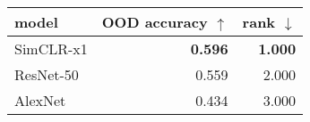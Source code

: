 \begin{tabular}{lrr}
\toprule
     model & OOD accuracy $\uparrow$ & rank $\downarrow$ \\
\midrule
 SimCLR-x1 &          \textbf{0.596} &    \textbf{1.000} \\
 ResNet-50 &                   0.559 &             2.000 \\
   AlexNet &                   0.434 &             3.000 \\
\bottomrule
\end{tabular}

